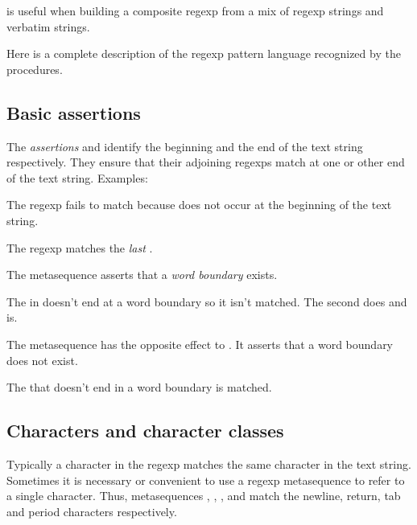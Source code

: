 {

 is useful when building a composite
regexp from a mix of regexp strings and verbatim strings. 



Here is a complete description of the regexp pattern
language recognized by the  procedures.

\subsection{Basic assertions}

The {\em assertions} \p{^} and \p{$} identify the
beginning and the end of the text string respectively.
They ensure that their adjoining regexps match at
one or other end of the text string.
Examples:


\n The regexp fails to match because  does not
occur at the beginning of the text string.


\n The regexp matches the {\em last} .

The metasequence \p{\b} asserts that
a {\em word boundary} exists. 


\n The  in  doesn't end at a word
boundary so it isn't matched.  The second  does
and is.

The metasequence \p{\B} has the opposite effect
to \p{\b}.   It asserts that a word boundary
does not exist.


\n The  that doesn't end in a word boundary
is matched.

\subsection{Characters and character classes}

Typically a character in the regexp matches the same
character in the text string.  Sometimes it is
necessary or convenient to use a regexp
metasequence to refer to a single character.
Thus, metasequences \p{\n}, \p{\r}, \p{\t}, and \p{\.}
match the newline, return, tab and period characters
respectively.

}
